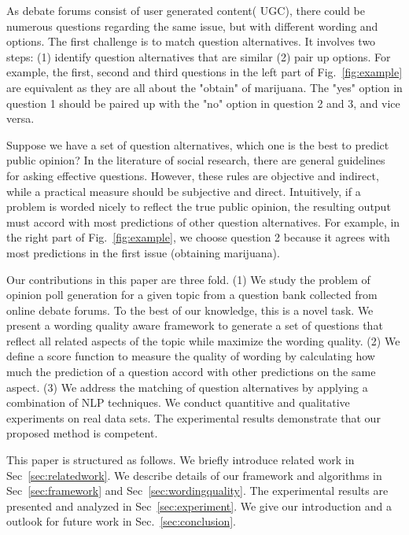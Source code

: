 \documentclass{llncs}
\begin{document}
As debate forums consist of user generated content( UGC), there could be numerous questions regarding the same issue, but with different wording and options. The first challenge is to match question alternatives. It involves two steps: (1) identify question alternatives that are similar (2) pair up options. For example, the first, second and third questions  in the left part of Fig.~\ref{fig:example} are equivalent as they are all about the "obtain" of marijuana. The "yes" option in question 1 should be paired up with the "no" option in question 2 and 3, and vice versa.

Suppose we have a set of question alternatives, which one is the best to predict public opinion? In the literature of social research, there are general guidelines~\cite{Trochim2000Research} for asking effective questions. However, these rules are objective and indirect, while a practical measure should be subjective and direct. Intuitively, if a problem is worded nicely to reflect the true public opinion, the resulting output must accord with most predictions of other question alternatives. For example, in the right part of Fig.~\ref{fig:example}, we choose question 2 because it agrees with most predictions in the first issue (obtaining marijuana). 




Our contributions in this paper are three fold. (1) We study the problem of opinion poll generation for a given topic from a question bank collected from online debate forums. To the best of our knowledge, this is a novel task. We present a wording quality aware framework to generate a set of questions that reflect all related aspects of the topic while maximize the wording quality. (2) We define a score function to measure the quality of wording by calculating how much the prediction of a question accord with other predictions on the same aspect. (3) We address the matching of question alternatives by applying a combination of NLP techniques. We conduct quantitive and qualitative experiments on real data sets. The experimental results demonstrate that our proposed method is competent. 





This paper is structured as follows. We briefly introduce related work in Sec~\ref{sec:relatedwork}. We describe details of our framework and algorithms in Sec~\ref{sec:framework} and Sec~\ref{sec:wordingquality}. The experimental results are presented and analyzed in Sec~\ref{sec:experiment}. We give our introduction and a outlook for future work in Sec.~\ref{sec:conclusion}.
\end{document}
